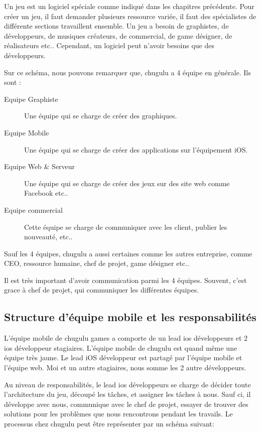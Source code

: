 Un jeu est un logiciel spéciale comme indiqué dans les chapitres précédente. Pour créer un jeu, il faut demander plusieurs ressource variée, il faut des spécialistes de différente sections travaillent ensemble. Un jeu a besoin de graphistes, de développeurs, de musiques créateurs, de commercial, de game désigner, de réalisateurs etc.. Cependant, un logiciel peut n'avoir besoins que des développeurs.  

Sur ce schéma, nous pouvons remarquer que, chugulu a 4 équipe en générale. Ils sont : 
\begin{description}
	\item[Equipe Graphiste] Une équipe qui se charge de créer des graphiques. 
	\item[Equipe Mobile] Une équipe qui se charge de créer des applications sur l'équipement iOS.
	\item[Equipe Web \& Serveur] Une équipe qui se charge de créer des jeux sur des site web comme Facebook etc..
	\item[Equipe commercial] Cette équipe se charge de communiquer avec les client, publier les nouveauté, etc..
\end{description}
Sauf les 4 équipes, chugulu a aussi certaines comme les autres entreprise, comme CEO, ressource humaine, chef de projet, game désigner etc..

Il est très important d'avoir communication parmi les 4 équipes. Souvent, c'est grace à chef de projet, qui communiquer les différentes équipes. 


\subsection{Structure d'équipe mobile et les responsabilités} %
\label{sub:structure_d_équipe_mobile_et_les_responsabilités}


L'équipe mobile de chugulu games a comporte de un lead ios développeurs et 2 ios développeur stagiaires. L'équipe mobile de chugulu est quand même une équipe très jaune. Le lead iOS développeur est partagé par l'équipe mobile et l'équipe web. Moi et un autre stagiaires, nous somme les 2 autre développeurs. 

Au niveau de responsabilités, le lead ios développeurs se charge de décider toute l'architecture du jeu, découpé les tâches, et assigner les tâches à nous. Sauf ci, il développe avec nous, communique avec le chef de projet, essayer de trouver des solutions pour les problèmes que nous rencontrons pendant les travails. Le processus chez chugulu peut être représenter par un schéma suivant:

